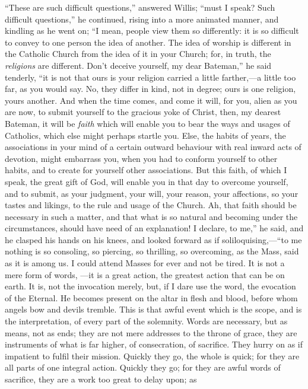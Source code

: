 ``These are such difficult questions,'' answered Willis;
``must I speak? Such difficult questions,'' he continued,
rising into a more animated manner, and kindling as he went on;
``I mean, people view them so differently: it is so difficult to
convey to one person the idea of another. The idea of worship is
different in the Catholic Church from the idea of it in your Church;
for, in truth, the \emph{religions} are different. Don't deceive
yourself, my dear Bateman,'' he said tenderly, ``it is not
that ours is your religion carried a little farther,—a little too
far, as you would say. No, they differ in kind, not in degree; ours is
one religion, yours another. And when the time comes, and come it
will, for you, alien as you are now, to submit yourself to the
gracious yoke of Christ, then, my dearest Bateman, it will be \emph{faith}
which will enable you to bear the ways and usages of Catholics, which
else might perhaps startle you. Else, the habits of years, the
associations in your mind of a certain outward behaviour with real
inward acts of devotion, might embarrass you, when you had to conform
yourself to other habits, and to create for yourself other
associations. But this faith, of which I speak, the great gift of God,
will enable you in that day to overcome yourself, and to submit, as
your judgment, your will, your reason, your affections, so your tastes
and likings, to the rule and usage of the Church. Ah, that faith
should be necessary in such a matter, and that what is so natural and
becoming under the circumstances, should have need of an explanation!
I declare, to me,'' he said, and he clasped his hands on his
knees, and looked forward as if soliloquising,—``to me nothing
is so consoling, so piercing, so thrilling, so overcoming, as the
Mass, said as it is among us. I could attend Masses for ever and not
be tired. It is not a mere form of words, —it is a great
action, the greatest action that can be on earth. It is, not the
invocation merely, but, if I dare use the word, the evocation of the
Eternal. He becomes present on the altar in flesh and blood, before
whom angels bow and devils tremble. This is that awful event which is
the scope, and is the interpretation, of every part of the solemnity.
Words are necessary, but as means, not as ends; they are not mere
addresses to the throne of grace, they are instruments of what is far
higher, of consecration, of sacrifice. They hurry on as if impatient
to fulfil their mission. Quickly they go, the whole is quick; for they
are all parts of one integral action. Quickly they go; for they are
awful words of sacrifice, they are a work too great to delay upon; as
